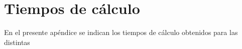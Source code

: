 \chapter{Tiempos de cálculo}
\label{ap:tiempos}

En el presente apéndice se indican los tiempos de cálculo obtenidos para las distintas 